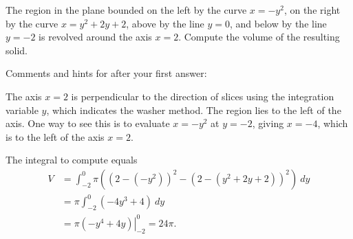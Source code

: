 \documentclass{ximera}
\begin{document}
\begin{question}%

The region in the plane bounded on the left by the curve \(x=-y^2\), on the right by the curve \(x=y^2+2y+2\), above by the line  \(y = 0\), and below by the line \(y = -2\) is revolved around the axis \(x = 2\). Compute the volume of the resulting solid.
\begin{multiplechoice}
\choice{\(16\pi\)}
\choice{\(20\pi\)}
\choice[correct]{\(24\pi\)}
\choice{\(28\pi\)}
\choice{\(32\pi\)}
\choice{\(36\pi\)}
\end{multiplechoice}
Comments and hints for after your first answer:
\begin{feedback}
The axis \(x = 2\) is perpendicular to the direction of slices using the integration variable \(y\), which indicates the washer method. 
 The region lies to the left of the axis. One way to see this is to evaluate \(x=-y^2\) at \(y = -2\), giving \(x = -4\), which is to the left of the axis \(x = 2\).
 \begin{hint}
The integral to compute equals \[ \begin{aligned} V &= \int_{-2}^{0}\pi \left((2-(-y^2))^2 - (2-(y^2+2y+2))^2\right)~ dy\\
& = \pi \int_{-2}^{0} (-4y^3+4)~ dy\\
& = \pi \left. \left(-y^4+4y\right) \right|_{-2}^{0} = 24\pi. \end{aligned}\]
\end{hint}
\end{feedback}

\end{question}
\end{document}

